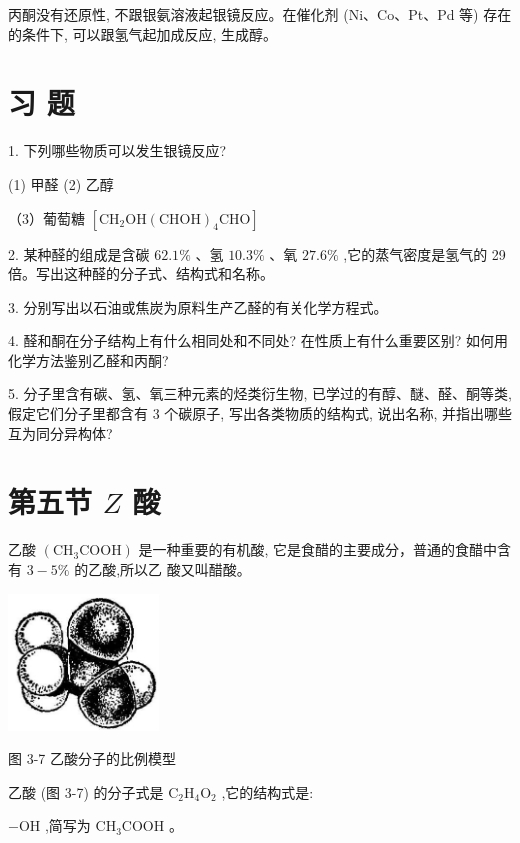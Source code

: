 \documentclass[10pt]{article}
\begin{document}
丙酮没有还原性, 不跟银氨溶液起银镜反应。在催化剂 (Ni、Co、Pt、Pd 等) 存在的条件下, 可以跟氢气起加成反应, 生成醇。

\section*{习 题}

1. 下列哪些物质可以发生银镜反应?

(1) 甲醛 (2) 乙醇

（3）葡萄糖 \(\left\lbrack {{\mathrm{{CH}}}_{2}\mathrm{{OH}}{\left( \mathrm{{CHOH}}\right) }_{4}\mathrm{{CHO}}}\right\rbrack\)

2. 某种醛的组成是含碳 \({62.1}\%\) 、氢 \({10.3}\%\) 、氧 \({27.6}\%\) ,它的蒸气密度是氢气的 29 倍。写出这种醛的分子式、结构式和名称。

3. 分别写出以石油或焦炭为原料生产乙醛的有关化学方程式。

4. 醛和酮在分子结构上有什么相同处和不同处? 在性质上有什么重要区别? 如何用化学方法鉴别乙醛和丙酮?

5. 分子里含有碳、氢、氧三种元素的烃类衍生物, 已学过的有醇、醚、醛、酮等类, 假定它们分子里都含有 3 个碳原子, 写出各类物质的结构式, 说出名称, 并指出哪些互为同分异构体?

\section*{第五节 \(Z\) 酸}

乙酸 \(\left( {{\mathrm{{CH}}}_{3}\mathrm{{COOH}}}\right)\) 是一种重要的有机酸, 它是食醋的主要成分，普通的食醋中含有 \(3 - 5\%\) 的乙酸,所以乙 酸又叫醋酸。

\begin{center}
\includegraphics[max width=0.3\textwidth]{images/01912d16-be99-77bb-9535-4f3ed8d9946f_132_697606.jpg}
\end{center}

图 3-7 乙酸分子的比例模型

乙酸 (图 3-7) 的分子式是 \({\mathrm{C}}_{2}{\mathrm{H}}_{4}{\mathrm{O}}_{2}\) ,它的结构式是:

\(- \mathrm{{OH}}\) ,简写为 \({\mathrm{{CH}}}_{3}\mathrm{{COOH}}\) 。
\end{document}
